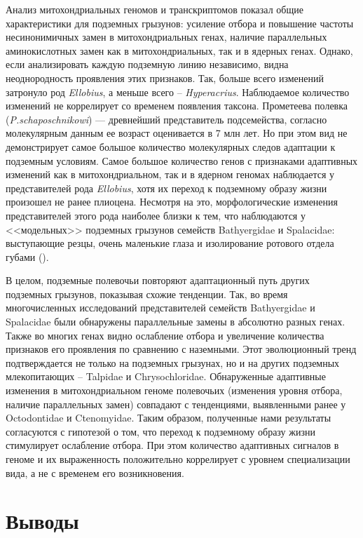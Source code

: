 Анализ митохондриальных геномов и транскриптомов показал общие характеристики для подземных грызунов: усиление отбора и повышение частоты несинонимичных замен в митохондриальных генах, наличие параллельных аминокислотных замен как в митохондриальных, так и в ядерных генах. Однако, если анализировать каждую подземную линию независимо, видна неоднородность проявления этих признаков. Так, больше всего изменений затронуло род \textit{Ellobius}, а меньше всего -- \textit{Hyperacrius}. Наблюдаемое количество изменений не коррелирует со временем появления таксона. Прометеева полевка (\textit{P.schaposchnikowi}) --- древнейший представитель подсемейства, согласно молекулярным данным ее возраст оценивается в 7 млн лет. Но при этом вид не демонстрирует самое большое количество молекулярных следов адаптации к подземным условиям. Самое большое количество генов с признаками адаптивных изменений как в митохондриальном, так и в ядерном геномах наблюдается у представителей рода \textit{Ellobius}, хотя их переход к подземному образу жизни произошел не ранее плиоцена. Несмотря на это, морфологические изменения представителей этого рода наиболее близки к тем, что наблюдаются у <<модельных>> подземных грызунов семейств Bathyergidae и Spalacidae: выступающие резцы, очень маленькие глаза и изолирование ротового отдела губами (\cite{Gromov1977}). 

В целом, подземные полевочьи повторяют адаптационный путь других подземных грызунов, показывая схожие тенденции. Так, во время многочисленных исследований представителей семейств Bathyergidae и Spalacidae были обнаружены параллельные замены в абсолютно разных генах. Также во многих генах видно ослабление отбора и увеличение количества признаков его проявления по сравнению с наземными. Этот эволюционный тренд подтверждается не только на подземных грызунах, но и на других подземных млекопитающих – Talpidae и Chrysochloridae. Обнаруженные адаптивные изменения в митохондриальном геноме полевочьих (изменения уровня отбора, наличие параллельных замен) совпадают с тенденциями, выявленными ранее у Octodontidae и Ctenomyidae. Таким образом, полученные нами результаты согласуются с гипотезой о том, что переход к подземному образу жизни стимулирует ослабление отбора. При этом количество адаптивных сигналов в геноме и их  выраженность положительно коррелирует  с уровнем специализации вида, а не с временем его возникновения.



\chapter{Выводы} 

